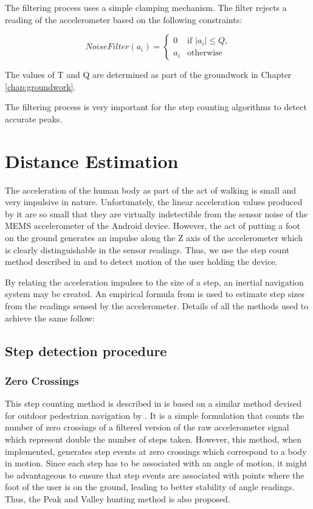 \documentclass[10pt,journal,letterpaper,compsoc]{IEEEtran}
\begin{document}
The filtering process uses a simple clamping mechanism. The filter 
rejects a reading of the accelerometer based on the following constraints:

\begin{equation}
NoiseFilter(a_i) =  \begin{cases} 0 & \text{if $|a_i| \le Q$,} \\
                                a_i & \text{otherwise}
                    \end{cases}
\end{equation}

The values of T and Q are determined as part of the groundwork in Chapter 
\ref{chap:groundwork}.

The filtering process is very important for the step counting algorithms
to detect accurate peaks.

\section{Distance Estimation}

The acceleration of the human body as part of the act of walking is small and 
very impulsive in nature. Unfortunately, the linear acceleration values
produced by it are so small that they are virtually indetectible from the 
sensor noise of the MEMS accelerometer of the Android device. However, the 
act of putting a foot on the ground generates an impulse along the Z 
axis of the accelerometer which is clearly distinguishable in the sensor 
readings. Thus, we use the step count method described in
\cite{Wang} and \cite{Ladetto} to detect motion of the user holding the device.

By relating the acceleration impulses to the size of a step, 
an inertial navigation system may be created. An empirical formula 
from \cite{ADXL202} is used to estimate step sizes from the readings sensed by
the accelerometer. Details of all the methods used to achieve the same 
follow:

\subsection{Step detection procedure\label{sec:step_detection}}

\subsubsection{Zero Crossings}

This step counting method is described in \cite{Wang} is based on a similar 
method devised for outdoor pedestrian navigation by \cite{Ladetto}. It is a
simple formulation that counts the number of zero crossings of a 
filtered version of the raw accelerometer signal which represent double the 
number of steps taken. However, this method, when implemented, generates 
step events at zero crossings which correspond to a body in motion.
Since each step has to be associated with an angle of motion, it might be 
advantageous to ensure that step events are associated with points where 
the foot of the user is on the ground, leading to better stability of angle 
readings. Thus, the Peak and Valley hunting method is also proposed. 
\end{document}
